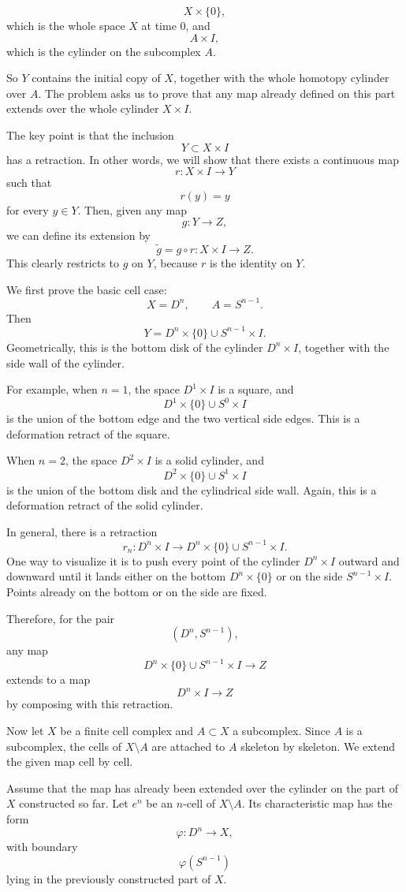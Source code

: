 \documentclass[12pt,a4paper]{article}
\theoremstyle{notespace}
\begin{document}
\[
X\times\{0\},
\]
which is the whole space \(X\) at time \(0\), and
\[
A\times I,
\]
which is the cylinder on the subcomplex \(A\).

So \(Y\) contains the initial copy of \(X\), together with the whole homotopy cylinder over \(A\). The problem asks us to prove that any map already defined on this part extends over the whole cylinder \(X\times I\).

The key point is that the inclusion
\[
Y\subset X\times I
\]
has a retraction. In other words, we will show that there exists a continuous map
\[
r:X\times I\longrightarrow Y
\]
such that
\[
r(y)=y
\]
for every \(y\in Y\). Then, given any map
\[
g:Y\longrightarrow Z,
\]
we can define its extension by
\[
\widetilde g=g\circ r:X\times I\longrightarrow Z.
\]
This clearly restricts to \(g\) on \(Y\), because \(r\) is the identity on \(Y\).

We first prove the basic cell case:
\[
X=D^n,\qquad A=S^{n-1}.
\]
Then
\[
Y=D^n\times\{0\}\cup S^{n-1}\times I.
\]
Geometrically, this is the bottom disk of the cylinder \(D^n\times I\), together with the side wall of the cylinder.

For example, when \(n=1\), the space \(D^1\times I\) is a square, and
\[
D^1\times\{0\}\cup S^0\times I
\]
is the union of the bottom edge and the two vertical side edges. This is a deformation retract of the square.

When \(n=2\), the space \(D^2\times I\) is a solid cylinder, and
\[
D^2\times\{0\}\cup S^1\times I
\]
is the union of the bottom disk and the cylindrical side wall. Again, this is a deformation retract of the solid cylinder.

In general, there is a retraction
\[
r_n:D^n\times I\longrightarrow D^n\times\{0\}\cup S^{n-1}\times I.
\]
One way to visualize it is to push every point of the cylinder \(D^n\times I\) outward and downward until it lands either on the bottom \(D^n\times\{0\}\) or on the side \(S^{n-1}\times I\). Points already on the bottom or on the side are fixed.

Therefore, for the pair
\[
(D^n,S^{n-1}),
\]
any map
\[
D^n\times\{0\}\cup S^{n-1}\times I
\longrightarrow Z
\]
extends to a map
\[
D^n\times I\longrightarrow Z
\]
by composing with this retraction.

Now let \(X\) be a finite cell complex and \(A\subset X\) a subcomplex. Since \(A\) is a subcomplex, the cells of \(X\setminus A\) are attached to \(A\) skeleton by skeleton. We extend the given map cell by cell.

Assume that the map has already been extended over the cylinder on the part of \(X\) constructed so far. Let \(e^n\) be an \(n\)-cell of \(X\setminus A\). Its characteristic map has the form
\[
\varphi:D^n\longrightarrow X,
\]
with boundary
\[
\varphi(S^{n-1})
\]
lying in the previously constructed part of \(X\).
\end{document}
